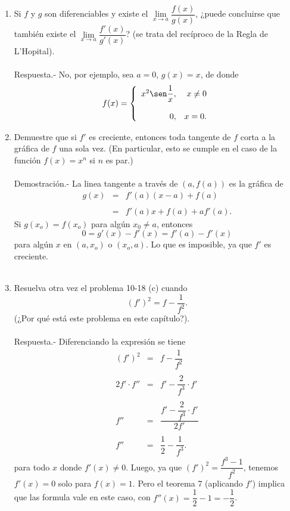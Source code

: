 \begin{enumerate}[\bfseries 1.]
    \item Si $f$ y $g$ son diferenciables y existe el $\lim\limits_{x\to a}\dfrac{f(x)}{g(x)}$, ¿puede concluirse que también existe el $\lim\limits_{x\to a}\dfrac{f'(x)}{g'(x)}$? (se trata del recíproco de la Regla de L'Hopital).\\\\
	Respuesta.-\; No, por ejemplo, sea $a=0$, $g(x)=x$, de donde
	$$
	f(x)=
	\left\{
	    \begin{array}{rr}
		x^2\sen \dfrac{1}{x}, & x\neq 0\\\\
		0, & x=0.
	    \end{array}
	\right.
	$$

    \item Demuestre que si $f'$ es creciente, entonces toda tangente de $f$ corta a la gráfica de $f$ una sola vez. (En particular, esto se cumple en el caso de la función $f(x)=x^n$ si $n$ es par.)\\\\
	Demostración.-\; La linea tangente  a través de $\left(a,f(a)\right)$ es la gráfica de
	$$
	\begin{array}{rcl}
	    g(x) &=& f'(a)(x-a)+f(a)\\\\
		 &=& f'(a)x+f(a)+af'(a).
	\end{array}
	$$
	Si $g(x_o)=f(x_o)$ para algún $x_0\neq a$, entonces
	$$0=g'(x)-f'(x)=f'(a)-f'(x)$$
	para algún $x$ en $(a,x_o)$ o $(x_o,a).$ Lo que es imposible, ya que $f'$ es creciente.\\\\

    \item Resuelva otra vez el problema 10-18 (c) cuando
    $$(f')^2=f-\dfrac{1}{f^2}.$$
    (¿Por qué está este problema en este capítulo?).\\\\
	Respuesta.-\; Diferenciando la expresión se tiene
	$$
	\begin{array}{rcl}
	    (f')^2 &=& f-\dfrac{1}{f^2}\\\\
	    2f'\cdot f'' &=& f'-\dfrac{2}{f^3}\cdot f'\\\\
	    f'' &=& \dfrac{f'-\dfrac{2}{f^3}\cdot f'}{2f'}\\\\
	    f''&=&\dfrac{1}{2}-\dfrac{1}{f^3}.
	\end{array}
	$$
	para todo $x$ donde $f'(x)\neq 0$. Luego, ya que $(f')^2=\dfrac{f^3-1}{f^2}$, tenemos $f'(x)=0$ solo para $f(x)=1$. Pero el teorema 7 (aplicando $f'$) implica que las formula vale en este caso, con $f''(x)=\dfrac{1}{2}-1=-\dfrac{1}{2}$.\\\\



\end{enumerate}
